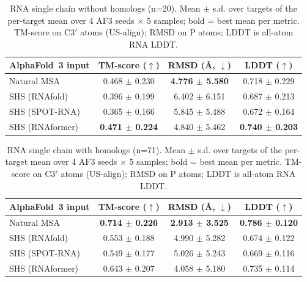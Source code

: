 \begin{table}[htbp]
\centering
\caption{RNA single chain without homologs (n=20). Mean $\pm$ s.d. over targets of the per-target mean over 4 AF3 seeds $\times$ 5 samples; bold = best mean per metric. TM-score on C3$'$ atoms (US-align); RMSD on P atoms; LDDT is all-atom RNA LDDT.}
\label{tab:rna_single_chain_without_homologs}
\begin{tabular}{lccc}
\toprule
AlphaFold~3 input & TM-score ($\uparrow$) & RMSD (\AA, $\downarrow$) & LDDT ($\uparrow$) \\
\midrule
Natural MSA & 0.468 $\pm$ 0.230 & \textbf{4.776 $\pm$ 5.580} & 0.718 $\pm$ 0.229 \\
SHS (RNAfold) & 0.396 $\pm$ 0.199 & 6.402 $\pm$ 6.151 & 0.687 $\pm$ 0.213 \\
SHS (SPOT-RNA) & 0.365 $\pm$ 0.166 & 5.845 $\pm$ 5.488 & 0.672 $\pm$ 0.164 \\
SHS (RNAformer) & \textbf{0.471 $\pm$ 0.224} & 4.840 $\pm$ 5.462 & \textbf{0.740 $\pm$ 0.203} \\
\bottomrule
\end{tabular}
\end{table}

\begin{table}[htbp]
\centering
\caption{RNA single chain with homologs (n=71). Mean $\pm$ s.d. over targets of the per-target mean over 4 AF3 seeds $\times$ 5 samples; bold = best mean per metric. TM-score on C3$'$ atoms (US-align); RMSD on P atoms; LDDT is all-atom RNA LDDT.}
\label{tab:rna_single_chain_with_homologs}
\begin{tabular}{lccc}
\toprule
AlphaFold~3 input & TM-score ($\uparrow$) & RMSD (\AA, $\downarrow$) & LDDT ($\uparrow$) \\
\midrule
Natural MSA & \textbf{0.714 $\pm$ 0.226} & \textbf{2.913 $\pm$ 3.525} & \textbf{0.786 $\pm$ 0.120} \\
SHS (RNAfold) & 0.553 $\pm$ 0.188 & 4.990 $\pm$ 5.282 & 0.674 $\pm$ 0.122 \\
SHS (SPOT-RNA) & 0.549 $\pm$ 0.177 & 5.026 $\pm$ 5.243 & 0.669 $\pm$ 0.116 \\
SHS (RNAformer) & 0.643 $\pm$ 0.207 & 4.058 $\pm$ 5.180 & 0.735 $\pm$ 0.114 \\
\bottomrule
\end{tabular}
\end{table}

